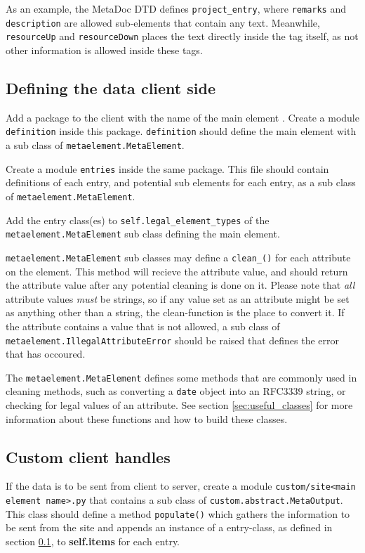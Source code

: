 As an example, the MetaDoc DTD \cite{metadoc_dtd} defines
\texttt{project\_entry}, where \texttt{remarks} and \texttt{description} are
allowed sub-elements that contain any text. Meanwhile, \texttt{resourceUp} and
\texttt{resourceDown} places the text directly inside the tag itself, as not
other information is allowed inside these tags.

\subsection{Defining the data client side}
\label{sec:defclientmodel}
Add a package to the client with the name of the main element
\cite{python_modules}. Create a module \texttt{definition} inside this package.
\texttt{definition} should define the main element with a sub class of
\texttt{metaelement.MetaElement}.

Create a module \texttt{entries} inside the same package. This file should
contain definitions of each entry, and potential sub elements for each entry,
as a sub class of \texttt{metaelement.MetaElement}. 

Add the entry class(es) to \texttt{self.legal\_element\_types} of the \\ 
\texttt{metaelement.MetaElement} sub class defining the main element. 

\texttt{metaelement.MetaElement} sub classes may define a
\texttt{clean\_<attribute name>()} for each attribute on the element. This method
will recieve the attribute value, and should return the attribute value after
any potential cleaning is done on it. Please note that \textit{all} attribute
values \textit{must} be strings, so if any value set as an attribute might be
set as anything other than a string, the clean-function is the place to convert
it. If the attribute contains a value that is not allowed, a sub class of
\texttt{metaelement.IllegalAttributeError} should be raised that defines the
error that has occoured. 

The \texttt{metaelement.MetaElement} defines some methods that are commonly
used in cleaning methods, such as converting a \texttt{date} object into an
RFC3339 string, or checking for legal values of an attribute. See section
\ref{sec:useful_classes} for more information about these functions and how to
build these classes.

\subsection{Custom client handles}
If the data is to be sent from client to server, create a module
\texttt{custom/site<main element name>.py} that contains a sub class of
\texttt{custom.abstract.MetaOutput}. This class should define a method
\texttt{populate()} which gathers the information to be sent from the site and
appends an instance of a entry-class, as defined in section
\ref{sec:defclientmodel}, to \textbf{self.items} for each entry.

